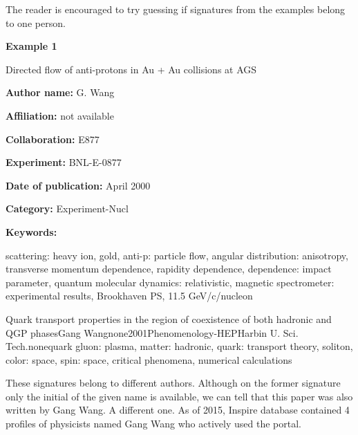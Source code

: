 \documentclass{pracamgr}
\begin{document}
The reader is encouraged to try guessing if signatures from the examples belong to one
person.

\newcommand{\signatureexample}[9] {
\begin{framed}
  {\fontsize{14}{16}\fontseries{bx}\selectfont #1}\par
  \begin{flushleft}
  \textbf{Author name:} #2 \par
  \textbf{Affiliation:} #6 \par
  \textbf{Collaboration:} #3 \par
  \textbf{Experiment:} #7 \par
  \textbf{Date of publication:} #4 \par
  \textbf{Category:} #5 \par
  \end{flushleft}
  \textbf{Keywords:}\par #8 
\end{framed}
}
\newpage


\begin{center}
\textbf{Example 1}
\label{ex1}
\signatureexample{Directed flow of anti-protons in Au + Au collisions at AGS}{G. Wang}{E877}{April 2000}{Experiment-Nucl}{not available}{BNL-E-0877}{scattering: heavy ion, gold, anti-p: particle flow, angular distribution: anisotropy, transverse momentum dependence, rapidity dependence, dependence: impact parameter, quantum molecular dynamics: relativistic, magnetic spectrometer: experimental results, Brookhaven PS, 11.5 GeV/c/nucleon}

\signatureexample{Quark transport properties in the region of coexistence of both hadronic and QGP phases}{Gang Wang}{none}{2001}{Phenomenology-HEP}{Harbin U. Sci. Tech.}{none}{quark gluon: plasma, matter: hadronic, quark: transport theory, soliton, color: space, spin: space, critical phenomena, numerical calculations}

\end{center}

These signatures belong to different authors. Although on the former signature only the
initial of the given name is available, we can tell that this paper was also written by
Gang Wang. A different one. As of 2015, Inspire database contained 4 profiles of
physicists named Gang Wang who actively used the portal.
\end{document}
